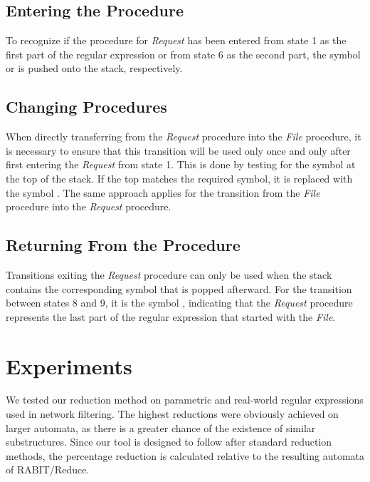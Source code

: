 \documentclass{ExcelAtFIT}
\newcommand{\circledtext}[2][red]{%
    \tikz[baseline=(char.base)]{
        \node[shape=circle, draw, fill=#1, inner sep=0pt] (char) {\hspace*{0.15mm}\textbf{\textcolor{#1}{#2}}};}\hspace*{-1mm}
}
\begin{document}
	\subsection*{Entering the Procedure}
		To recognize if the procedure for \textit{Request} has been entered from state 1 as the first part of the regular expression or from state 6 as the second part, the symbol \circledtext[orange]{1} or \circledtext[black!20!green]{6} is pushed onto the stack, respectively.

	\subsection*{Changing Procedures}
		When directly transferring from the \textit{Request} procedure into the \textit{File} procedure, it is necessary to ensure that this transition will be used only once and only after first entering the \textit{Request} from state 1. This is done by testing for the symbol \circledtext[orange]{1} at the top of the stack. If the top matches the required symbol, it is replaced with the symbol \circledtext[white!20!red]{5}. The same approach applies for the transition from the \textit{File} procedure into the \textit{Request} procedure.

	\subsection*{Returning From the Procedure}
		Transitions exiting the \textit{Request} procedure can only be used when the stack contains the corresponding symbol that is popped afterward. For the transition between states 8 and 9, it is the symbol \circledtext[black!20!green]{6}, indicating that the \textit{Request} procedure represents the last part of the regular expression that started with the \textit{File}.


\section{Experiments}
	We tested our reduction method on parametric and real-world regular expressions used in network filtering. The highest reductions were obviously achieved on larger automata, as there is a greater chance of the existence of similar substructures. Since our tool is designed to follow after standard reduction methods, the percentage reduction is calculated relative to the resulting automata of RABIT/Reduce.
\end{document}
